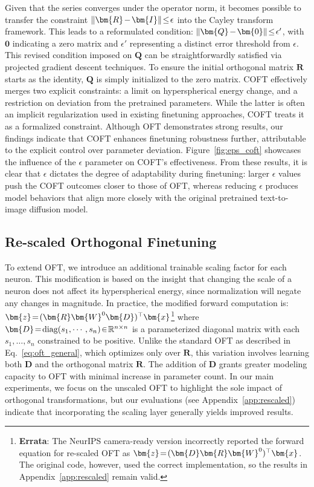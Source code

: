 Given that the series converges under the operator norm, it becomes possible to transfer the constraint $\thickmuskip=2mu \medmuskip=2mu\|\bm{R}-\bm{I}\|\leq\epsilon$ into the Cayley transform framework. This leads to a reformulated condition: $\thickmuskip=2mu \medmuskip=2mu\|\bm{Q}-\bm{0}\|\leq\epsilon'$, with $\bm{0}$ indicating a zero matrix and $\epsilon'$ representing a distinct error threshold from $\epsilon$. This revised condition imposed on $\bm{Q}$ can be straightforwardly satisfied via projected gradient descent techniques. To ensure the initial orthogonal matrix $\bm{R}$ starts as the identity, $\bm{Q}$ is simply initialized to the zero matrix. COFT effectively merges two explicit constraints: a limit on hyperspherical energy change, and a restriction on deviation from the pretrained parameters. While the latter is often an implicit regularization used in existing finetuning approaches, COFT treats it as a formalized constraint. Although OFT demonstrates strong results, our findings indicate that COFT enhances finetuning robustness further, attributable to the explicit control over parameter deviation. Figure~\ref{fig:eps_coft} showcases the influence of the $\epsilon$ parameter on COFT's effectiveness. From these results, it is clear that $\epsilon$ dictates the degree of adaptability during finetuning: larger $\epsilon$ values push the COFT outcomes closer to those of OFT, whereas reducing $\epsilon$ produces model behaviors that align more closely with the original pretrained text-to-image diffusion model.

\subsection{Re-scaled Orthogonal Finetuning}

To extend OFT, we introduce an additional trainable scaling factor for each neuron. This modification is based on the insight that changing the scale of a neuron does not affect its hyperspherical energy, since normalization will negate any changes in magnitude. In practice, the modified forward computation is: $\thickmuskip=2mu \medmuskip=2mu\bm{z}=(\bm{R}\bm{W}^0\bm{D})^\top\bm{x}$\footnote{\textbf{Errata}: The NeurIPS camera-ready version incorrectly reported the forward equation for re-scaled OFT as $\thickmuskip=2mu \medmuskip=2mu\bm{z}=(\bm{D}\bm{R}\bm{W}^0)^\top\bm{x}$. The original code, however, used the correct implementation, so the results in Appendix~\ref{app:rescaled} remain valid.} where $\thickmuskip=2mu \medmuskip=2mu \bm{D}=\text{diag}(s_1,\cdots,s_n)\in\mathbb{R}^{n\times n}$ is a parameterized diagonal matrix with each $s_1,\ldots,s_n$ constrained to be positive. Unlike the standard OFT as described in Eq.~\eqref{eq:oft_general}, which optimizes only over $\bm{R}$, this variation involves learning both $\bm{D}$ and the orthogonal matrix $\bm{R}$. The addition of $\bm{D}$ grants greater modeling capacity to OFT with minimal increase in parameter count. In our main experiments, we focus on the unscaled OFT to highlight the sole impact of orthogonal transformations, but our evaluations (see Appendix~\ref{app:rescaled}) indicate that incorporating the scaling layer generally yields improved results.

